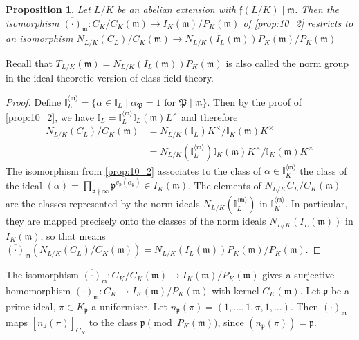 \documentclass[11pt]{article}
\theoremstyle{definition}
\theoremstyle{plain}
\newtheorem{proposition}[definition]{Proposition}
\theoremstyle{remark}
\newcommand{\II}{\mathbb{I}}
\newcommand{\cp}{\mathfrak{P}}
\newcommand{\ff}{\mathfrak{f}}
\newcommand{\fp}{\mathfrak{p}}
\newcommand{\fm}{\mathfrak{m}}
\begin{document}
\begin{proposition}\label{prop:10.3}
    Let $L/K$ be an abelian extension with $\ff(L/K) \mid \fm$. Then the isomorphism $\overline{(\cdot)}_\fm : C_K / C_K(\fm) \to I_K(\fm) / P_K(\fm)$ of \autoref{prop:10_2} restricts to an isomorphism $N_{L/K} (C_L) / C_K(\fm) \to N_{L/K}(I_L(\fm)) P_K(\fm) / P_K(\fm)$
\end{proposition}
Recall that $T_{L/K}(\fm) = N_{L/K}(I_L(\fm)) P_K(\fm)$ is also called the norm group in the ideal theoretic version of class field theory.
\begin{proof}
    Define $\II_L^{\langle \fm \rangle} = \{\alpha \in \II_L \mid \alpha_\cp = 1 \text{ for } \cp \mid \fm\}$. Then by the proof of \autoref{prop:10_2}, we have $\II_L = \II_L^{\langle \fm \rangle} \II_L(\fm) L^\times$ and therefore
    \begin{align*}
        N_{L/K}(C_L) / C_K(\fm)
        &= N_{L/K}(\II_L) K^\times / \II_K(\fm) K^\times\\
        &= N_{L/K} (\II_L^{\langle \fm \rangle}) \II_K(\fm) K^\times / \II_K(\fm) K^\times
    \end{align*}
    The isomorphism from \autoref{prop:10_2} associates to the class of $\alpha \in \II_K^{\langle \fm \rangle}$ the class of the ideal $(\alpha) = \prod_{\fp \nmid \infty} \fp^{v_\fp(\alpha_\fp)} \in I_K(\fm)$. The elements of $N_{L/K} C_L / C_K(\fm)$ are the classes represented by the norm ideals $N_{L/K}(\II_L^{\langle \fm \rangle})$ in $\II_K^{\langle \fm \rangle}$. In particular, they are mapped precisely onto the classes of the norm ideals $N_{L/K}(I_L(\fm))$ in $I_K(\fm)$, so that means $\overline{(\cdot)}_\fm (N_{L/K}(C_L) / C_K(\fm)) = N_{L/K}(I_L(\fm)) P_K(\fm) / P_K(\fm)$.
\end{proof}

The isomorphism $\overline{(\cdot)}_\fm : C_K / C_K(\fm) \to I_K(\fm) / P_K(\fm)$ gives a surjective homomorphism $(\cdot)_\fm : C_K \to I_K(\fm) / P_K(\fm)$ with kernel $C_K(\fm)$. Let $\fp$ be a prime ideal, $\pi \in K_\fp$ a uniformiser. Let $n_\fp(\pi) = (1, \ldots, 1, \pi, 1, \ldots)$. Then $(\cdot)_\fm$ maps $[n_\fp(\pi)]_{C_K}$ to the class $\fp \pmod{P_K(\fm)}$, since $(n_\fp(\pi)) = \fp$.
\end{document}
